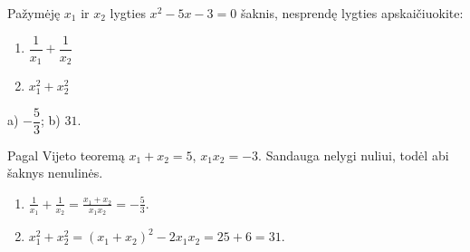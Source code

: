 \begin{salyga}
Pažymėję $x_1$ ir $x_2$ lygties $x^2 - 5x - 3 = 0$ šaknis, nesprendę lygties apskaičiuokite:
    \begin{enumerate}[label=\alph*), itemsep=4pt]
        \item $\dfrac{1}{x_1} + \dfrac{1}{x_2}$
        \item $x_1^2 + x_2^2$
    \end{enumerate}
\end{salyga}

\begin{atsakymas}
a) $-\dfrac53$; b) $31$.
\end{atsakymas}

\begin{sprendimas}
Pagal Vijeto teoremą $x_1+x_2=5$, $x_1x_2=-3$. Sandauga nelygi nuliui, todėl abi šaknys nenulinės.
\begin{enumerate}[label=\alph*)]
\item $\displaystyle\frac1{x_1}+\frac1{x_2}=\frac{x_1+x_2}{x_1x_2}=-\frac53$.
\item $x_1^2+x_2^2=(x_1+x_2)^2-2x_1x_2=25+6=31$.
\end{enumerate}
\end{sprendimas}
